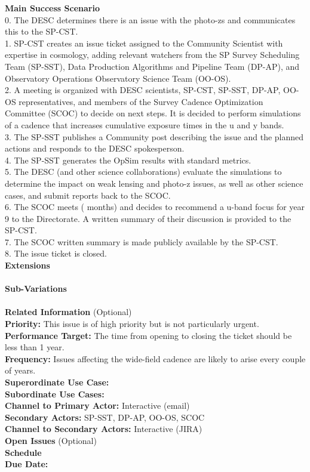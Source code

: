 \textbf{Main Success Scenario} \\
0. The DESC determines there is an issue with the photo-zs and communicates this to the SP-CST. \\
1. SP-CST creates an issue ticket assigned to the Community Scientist with expertise in cosmology, adding relevant watchers from the SP Survey Scheduling Team (SP-SST), Data Production Algorithms and Pipeline Team (DP-AP), and Observatory Operations Observatory Science Team (OO-OS). \\
2. A meeting is organized with DESC scientists, SP-CST, SP-SST, DP-AP, OO-OS representatives, and members of the Survey Cadence Optimization Committee (SCOC) to decide on next steps. It is decided to perform simulations of a cadence that increases cumulative exposure times in the u and y bands. \\
3. The SP-SST publishes a Community post describing the issue and the planned actions and responds to the DESC spokesperson. \\
4. The SP-SST generates the OpSim results with standard metrics. \\ 
5. The DESC (and other science collaborations) evaluate the simulations to determine the impact on weak lensing and photo-z issues, as well as other science cases, and submit reports back to the SCOC. \\
6. The SCOC meets ( months) and decides to recommend a u-band focus for year 9 to the Directorate. A written summary of their discussion is provided to the SP-CST. \\
7. The SCOC written summary is made publicly available by the SP-CST. \\
8. The issue ticket is closed. \\

\textbf{Extensions} \\
\\

\textbf{Sub-Variations} \\
\\

\textbf{Related Information} (Optional) \\
\textbf{Priority:} This issue is of high priority but is not particularly urgent. \\
\textbf{Performance Target:} The time from opening to closing the ticket should be less than 1 year. \\
\textbf{Frequency:} Issues affecting the wide-field cadence are likely to arise every couple of years. \\
\textbf{Superordinate Use Case:} \\
\textbf{Subordinate Use Cases:} \\
\textbf{Channel to Primary Actor:} Interactive (email) \\
\textbf{Secondary Actors:} SP-SST, DP-AP, OO-OS, SCOC \\
\textbf{Channel to Secondary Actors:} Interactive (JIRA) \\

\textbf{Open Issues} (Optional) \\

\textbf{Schedule} \\
\textbf{Due Date:} \\
